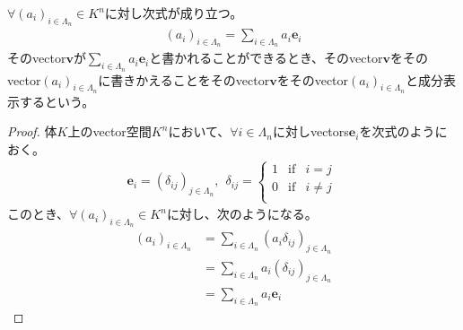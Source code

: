 \documentclass[dvipdfmx]{jsarticle}
\begin{document}
\begin{thm}\label{4.1.2.4}
$\forall\left( a_{i} \right)_{i \in \varLambda_{n}} \in K^{n}$に対し次式が成り立つ。
\begin{align*}
\left( a_{i} \right)_{i \in \varLambda_{n}} = \sum_{i \in \varLambda_{n}} {a_{i}\mathbf{e}_{i}}
\end{align*}
そのvector$\mathbf{v}$が$\sum_{i \in \varLambda_{n}} {a_{i}\mathbf{e}_{i}}$と書かれることができるとき、そのvector$\mathbf{v}$をそのvector$\left( a_{i} \right)_{i \in \varLambda_{n}}$に書きかえることをそのvector$\mathbf{v}$をそのvector$\left( a_{i} \right)_{i \in \varLambda_{n}}$と成分表示するという。
\end{thm}
\begin{proof}
体$K$上のvector空間$K^{n}$において、$\forall i \in \varLambda_{n}$に対しvectors$\mathbf{e}_{i}$を次式のようにおく。
\begin{align*}
\mathbf{e}_{i} = \left( \delta_{ij} \right)_{j \in \varLambda_{n}},\ \ \delta_{ij} = \left\{ \begin{matrix}
1 & \mathrm{if} & i = j \\
0 & \mathrm{if} & i \neq j \\
\end{matrix} \right.\ 
\end{align*}
このとき、$\forall\left( a_{i} \right)_{i \in \varLambda_{n}} \in K^{n}$に対し、次のようになる。
\begin{align*}
\left( a_{i} \right)_{i \in \varLambda_{n}} &= \sum_{i \in \varLambda_{n}} \left( a_{i}\delta_{ij} \right)_{j \in \varLambda_{n}}\\
&= \sum_{i \in \varLambda_{n}} {a_{i}\left( \delta_{ij} \right)_{j \in \varLambda_{n}}}\\
&= \sum_{i \in \varLambda_{n}} {a_{i}\mathbf{e}_{i}}
\end{align*}
\end{proof}
\end{document}
